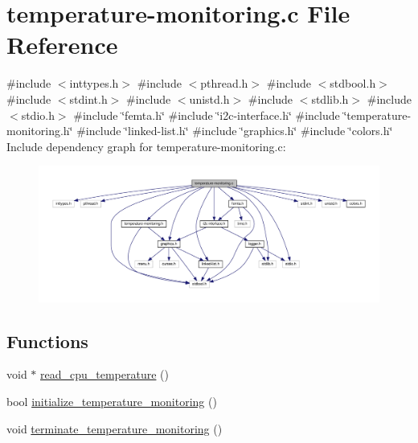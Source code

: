 \hypertarget{temperature-monitoring_8c}{}\section{temperature-\/monitoring.c File Reference}
\label{temperature-monitoring_8c}
{\ttfamily \#include $<$inttypes.\+h$>$}\newline
{\ttfamily \#include $<$pthread.\+h$>$}\newline
{\ttfamily \#include $<$stdbool.\+h$>$}\newline
{\ttfamily \#include $<$stdint.\+h$>$}\newline
{\ttfamily \#include $<$unistd.\+h$>$}\newline
{\ttfamily \#include $<$stdlib.\+h$>$}\newline
{\ttfamily \#include $<$stdio.\+h$>$}\newline
{\ttfamily \#include \char`\"{}femta.\+h\char`\"{}}\newline
{\ttfamily \#include \char`\"{}i2c-\/interface.\+h\char`\"{}}\newline
{\ttfamily \#include \char`\"{}temperature-\/monitoring.\+h\char`\"{}}\newline
{\ttfamily \#include \char`\"{}linked-\/list.\+h\char`\"{}}\newline
{\ttfamily \#include \char`\"{}graphics.\+h\char`\"{}}\newline
{\ttfamily \#include \char`\"{}colors.\+h\char`\"{}}\newline
Include dependency graph for temperature-\/monitoring.c\+:
\nopagebreak
\begin{figure}[H]
\begin{center}
\leavevmode
\includegraphics[width=350pt]{temperature-monitoring_8c__incl}
\end{center}
\end{figure}
\subsection*{Functions}
\begin{DoxyCompactItemize}
\item 
void $\ast$ \hyperlink{temperature-monitoring_8c_a6a33eb327dd6b9aac62b32cf7220cca0}{read\+\_\+cpu\+\_\+temperature} ()
\item 
bool \hyperlink{temperature-monitoring_8c_a1d2bab81a3e6aa84eb0c2e0172594299}{initialize\+\_\+temperature\+\_\+monitoring} ()
\item 
void \hyperlink{temperature-monitoring_8c_a8b1be00dadac2a3d808233430fb2cf8b}{terminate\+\_\+temperature\+\_\+monitoring} ()
\end{DoxyCompactItemize}
